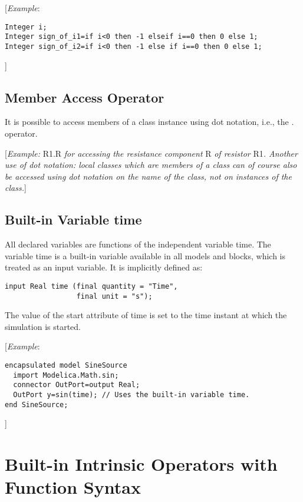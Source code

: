 {[}\emph{Example}:
\begin{lstlisting}[language=modelica]
Integer i;
Integer sign_of_i1=if i<0 then -1 elseif i==0 then 0 else 1;
Integer sign_of_i2=if i<0 then -1 else if i==0 then 0 else 1;
\end{lstlisting}
{]}

\subsection{Member Access Operator}

It is possible to access members of a class instance using dot notation,
i.e., the . operator.

{[}\emph{Example:} R1.R \emph{for accessing the resistance component} R
\emph{of resistor} R1\emph{. Another use of dot notation: local classes
which are members of a class can of course also be accessed using dot
notation on the name of the class, not on instances of the class.}{]}

\subsection{Built-in Variable time}

All declared variables are functions of the independent variable time.
The variable time is a built-in variable available in all models and
blocks, which is treated as an input variable. It is implicitly defined
as:
\begin{lstlisting}[language=modelica]
input Real time (final quantity = "Time",
                 final unit = "s");
\end{lstlisting}

The value of the start attribute of time is set to the time instant at
which the simulation is started.

{[}\emph{Example}:
\begin{lstlisting}[language=modelica]
encapsulated model SineSource
  import Modelica.Math.sin;
  connector OutPort=output Real;
  OutPort y=sin(time); // Uses the built-in variable time.
end SineSource;
\end{lstlisting}
{]}

\section{Built-in Intrinsic Operators with Function Syntax}

